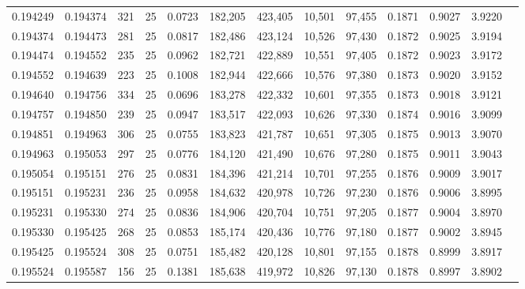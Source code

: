 \begin{tabular}{rrrrrrrrrrrrr}
0.194249 & 0.194374 &   321 &  25 &                                     0.0723 & 182,205 & 423,405 &  10,501 &  97,455 & 0.1871 & 0.9027 & 3.9220 \\
0.194374 & 0.194473 &   281 &  25 &                                     0.0817 & 182,486 & 423,124 &  10,526 &  97,430 & 0.1872 & 0.9025 & 3.9194 \\
0.194474 & 0.194552 &   235 &  25 &                                     0.0962 & 182,721 & 422,889 &  10,551 &  97,405 & 0.1872 & 0.9023 & 3.9172 \\
0.194552 & 0.194639 &   223 &  25 &                                     0.1008 & 182,944 & 422,666 &  10,576 &  97,380 & 0.1873 & 0.9020 & 3.9152 \\
0.194640 & 0.194756 &   334 &  25 &                                     0.0696 & 183,278 & 422,332 &  10,601 &  97,355 & 0.1873 & 0.9018 & 3.9121 \\
0.194757 & 0.194850 &   239 &  25 &                                     0.0947 & 183,517 & 422,093 &  10,626 &  97,330 & 0.1874 & 0.9016 & 3.9099 \\
0.194851 & 0.194963 &   306 &  25 &                                     0.0755 & 183,823 & 421,787 &  10,651 &  97,305 & 0.1875 & 0.9013 & 3.9070 \\
0.194963 & 0.195053 &   297 &  25 &                                     0.0776 & 184,120 & 421,490 &  10,676 &  97,280 & 0.1875 & 0.9011 & 3.9043 \\
0.195054 & 0.195151 &   276 &  25 &                                     0.0831 & 184,396 & 421,214 &  10,701 &  97,255 & 0.1876 & 0.9009 & 3.9017 \\
0.195151 & 0.195231 &   236 &  25 &                                     0.0958 & 184,632 & 420,978 &  10,726 &  97,230 & 0.1876 & 0.9006 & 3.8995 \\
0.195231 & 0.195330 &   274 &  25 &                                     0.0836 & 184,906 & 420,704 &  10,751 &  97,205 & 0.1877 & 0.9004 & 3.8970 \\
0.195330 & 0.195425 &   268 &  25 &                                     0.0853 & 185,174 & 420,436 &  10,776 &  97,180 & 0.1877 & 0.9002 & 3.8945 \\
0.195425 & 0.195524 &   308 &  25 &                                     0.0751 & 185,482 & 420,128 &  10,801 &  97,155 & 0.1878 & 0.8999 & 3.8917 \\
0.195524 & 0.195587 &   156 &  25 &                                     0.1381 & 185,638 & 419,972 &  10,826 &  97,130 & 0.1878 & 0.8997 & 3.8902 \\

\end{tabular}

